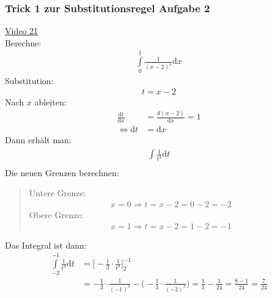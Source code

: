 \subsubsection{Trick 1 zur Substitutionsregel Aufgabe 2}
\href{https://youtu.be/tlmzM6q92Lc}{Video 21}\\
Berechne:\\
\begin{align*}
\int\limits_{0}^{1} \frac{1}{(x-2)^4}\mathrm{d}x 
\end{align*}
Substitution:\\
\begin{align*}
t=x-2
\end{align*}
Nach $ x $ ableiten:\\
\begin{align*}
\frac{\mathrm{d}t}{\mathrm{d}x}&=\frac{d(x-2)}{\mathrm{d}x}=1\\
\Leftrightarrow \mathrm{d}t&=\mathrm{d}x
\end{align*}
Dann erhält man:\\
\begin{align*}
\int\limits_{}^{} \frac{1}{t^4}\mathrm{d}t
\end{align*}
Die neuen Grenzen berechnen:\\
\begin{quote}
	Untere Grenze:\\
	\begin{align*}
	x=0\Rightarrow t=x-2= 0-2=-2
	\end{align*}
	Obere Grenze:\\
	\begin{align*}
	x=1\Rightarrow t=x-2= 1-2=-1
	\end{align*}
\end{quote}
Das Integral ist dann:\\
\begin{align*}
\int\limits_{-2}^{-1} \frac{1}{t^4}\mathrm{d}t&=\bigg[-\frac{1}{3}\cdot\frac{1}{t^3}\bigg]^{-1}_2\\
&=-\frac{1}{3}\cdot\frac{1}{(-1)^3}-\bigg(-\frac{1}{3}\cdot\frac{1}{(-2)^3}\bigg)=\frac{1}{3}-\frac{1}{24}=\frac{8-1}{24}=\frac{7}{24}
\end{align*}
